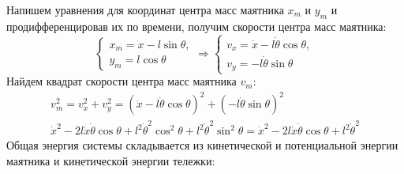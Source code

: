 Напишем уравнения для координат центра масс маятника $x_m$ и $y_m$ и продифференцировав их по времени, получим скорости центра масс маятника:
\begin{equation}
    \begin{cases}
        x_m = x - l\sin\theta, \\
        y_m = l\cos\theta
    \end{cases} \Rightarrow
    \begin{cases}
        v_x = \dot{x} - l\dot{\theta}\cos\theta, \\
        v_y = -l\dot{\theta}\sin\theta
    \end{cases}
\end{equation}
Найдем квадрат скорости центра масс маятника $v_m$:
\begin{multline}
    v_m^2 = v_x^2 + v_y^2 = \left(\dot{x} - l\dot{\theta}\cos\theta\right)^2 + \left(-l\dot{\theta}\sin\theta\right)^2 \\
    \dot{x}^2 - 2l\dot{x}\dot{\theta}\cos\theta + l^2\dot{\theta}^2\cos^2\theta + l^2\dot{\theta}^2\sin^2\theta = \dot{x}^2 - 2l\dot{x}\dot{\theta}\cos\theta + l^2\dot{\theta}^2
\end{multline}
Общая энергия системы складывается из кинетической и потенциальной энергии маятника и кинетической энергии тележки:

